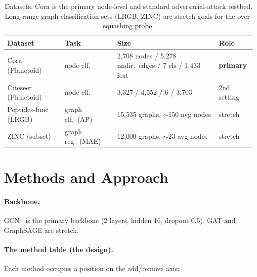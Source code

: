 \documentclass[10pt]{article}
\begin{document}
\begin{table}[h]
\centering
\small
\begin{tabular}{@{}llll@{}}
\toprule
\textbf{Dataset} & \textbf{Task} & \textbf{Size} & \textbf{Role} \\
\midrule
Cora (Planetoid)     & node clf.            & 2{,}708 nodes / 5{,}278 undir.\ edges / 7 cls / 1{,}433 feat & \textbf{primary} \\
Citeseer (Planetoid) & node clf.            & 3{,}327 / 4{,}552 / 6 / 3{,}703                              & 2nd setting \\
Peptides-func (LRGB) & graph clf.\ (AP)     & 15{,}535 graphs, $\sim$150 avg nodes                          & stretch \\
ZINC (subset)        & graph reg.\ (MAE)    & 12{,}000 graphs, $\sim$23 avg nodes                          & stretch \\
\bottomrule
\end{tabular}
\caption{Datasets. Cora is the primary node-level and standard adversarial-attack testbed.
Long-range graph-classification sets (LRGB, ZINC) are stretch goals for the over-squashing probe.}
\end{table}

\section{Methods and Approach}
\paragraph{Backbone.} GCN~\citep{kipf2017gcn} is the primary backbone (2 layers, hidden $16$, dropout
$0.5$). GAT and GraphSAGE are stretch.

\paragraph{The method table (the design).} Each method occupies a position on the add/remove axis:
\end{document}
